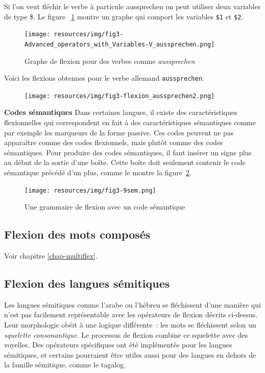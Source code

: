 \noindent Si l'on veut fléchir le verbe à particule aussprechen on peut utiliser deux variables de type \$.
Le figure ~\ref{fig-inflection-aussprechen} montre un graphe qui comport les variables \verb+$1+ et \verb+$2+.

\bigskip
\begin{figure}[!ht]
\begin{center}
\texttt{[image: resources/img/fig3-Advanced\_operators\_with\_Variables-V\_aussprechen.png]}
\caption{Graphe de flexion pour des verbes comme {\it aussprechen}
\label{fig-inflection-aussprechen}}
\end{center}
\end{figure}

\noindent Voici les flexions obtenues pour le verbe allemand \verb+aussprechen+:
\bigskip
\begin{figure}[!ht]
\begin{center}
\texttt{[image: resources/img/fig3-flexion\_aussprechen2.png]}
\end{center}
\end{figure}

\bigskip
\noindent \textbf{Codes sémantiques}
\noindent Dans certaines langues, il existe des caractéristiques flexionnelles qui correspondent
en fait à des caractéristiques sémantiques comme par exemple les marqueurs de la forme passive.
Ces codes peuvent ne pas apparaître comme des codes flexionnels, mais plutôt comme des codes
sémantiques. Pour produire des codes sémantiques, il faut insérer un signe plus au début de la
sortie d'une boîte. Cette boîte doit seulement contenir le code sémantique précédé d'un plus, comme
le montre la figure~\ref{fig-inflection-sem}.

\bigskip
\begin{figure}[!ht]
\begin{center}
\texttt{[image: resources/img/fig3-9sem.png]}
\caption{Une grammaire de flexion avec un code sémantique\label{fig-inflection-sem}}
\end{center}
\end{figure}


\subsection{Flexion des mots composés}
Voir chapitre \ref{chap-multiflex}.


\subsection{Flexion des langues sémitiques}
\label{subsection-semitic-inflection}
Les langues  sémitiques comme l'arabe ou l'hébreu se fléchissent d'une manière qui n'est pas facilement représentable
avec les opérateurs de flexion décrits ci-dessus. Leur morphologie obéit à une logique différente~:
les mots se fléchissent selon un \textit{squelette consonantique}.
Le processus de flexion combine ce squelette avec des voyelles.
Des opérateurs spécifiques ont été implémentés pour les langues sémitiques, et certains pourraient être utiles
aussi pour des langues en dehors de la famille sémitique, comme le tagalog.

